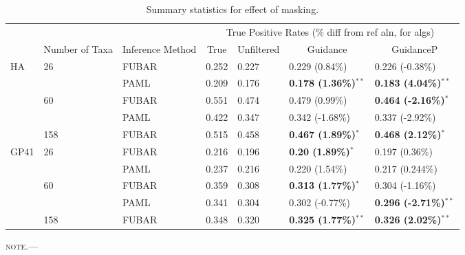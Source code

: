 \documentclass[11pt]{article}
\begin{document}

\begin{table}[htbp]
\begin{adjustwidth}{-1.75cm}{}
\caption {\label{tab:summarystats} Summary statistics for effect of masking.}
\begin{tabular}{l l l l l l l}
\hline\noalign{\smallskip}
& & & \multicolumn{4}{c}{True Positive Rates (\% diff from ref aln, for algs)} \\
\cline{4-7}\noalign{\smallskip}
\multicolumn{1}{c}{Selective Profile} & \multicolumn{1}{c}{Number of Taxa} & \multicolumn{1}{c}{Inference Method} & \multicolumn{1}{c}{True} & \multicolumn{1}{c}{Unfiltered} & \multicolumn{1}{c}{Guidance} & \multicolumn{1}{c}{GuidanceP} \\
\noalign{\smallskip}\hline\noalign{\smallskip}
HA & 26 & FUBAR & 0.252 & 0.227 & 0.229 (0.84\%) & 0.226 (-0.38\%) \\
 &   & PAML & 0.209 & 0.176 & \textbf{0.178 (1.36\%)}$^{\ast\ast}$ & \textbf{0.183 (4.04\%)}$^{\ast\ast}$ \\
\hline
 & 60 & FUBAR & 0.551 & 0.474 & 0.479 (0.99\%) & \textbf{0.464 (-2.16\%)}$^{\ast}$  \\
 &  & PAML & 0.422 & 0.347 & 0.342 (-1.68\%) & 0.337 (-2.92\%) \\
 \hline
 & 158 & FUBAR & 0.515 & 0.458 & \textbf{0.467 (1.89\%)}$^{\ast}$ & \textbf{0.468 (2.12\%)}$^{\ast}$ \\
\hline
GP41 & 26 & FUBAR & 0.216 & 0.196 & \textbf{0.20 (1.89\%)}$^{\ast}$ & 0.197 (0.36\%) \\
 & & PAML & 0.237 & 0.216 & 0.220 (1.54\%) & 0.217 (0.244\%) \\
 \hline
 & 60 & FUBAR & 0.359 & 0.308 & \textbf{0.313 (1.77\%)}$^{\ast}$ & 0.304 (-1.16\%)\\
 & & PAML & 0.341 & 0.304 & 0.302 (-0.77\%) & \textbf{0.296 (-2.71\%)}$^{\ast\ast}$ \\
 \hline
 & 158 & FUBAR & 0.348 & 0.320 & \textbf{0.325 (1.77\%)}$^{\ast\ast}$ & \textbf{0.326 (2.02\%)}$^{\ast\ast}$ \\
\hline
\end{tabular}
\newline
\textsc{note.}--- %
\end{adjustwidth}
\end{table}
\end{document}
